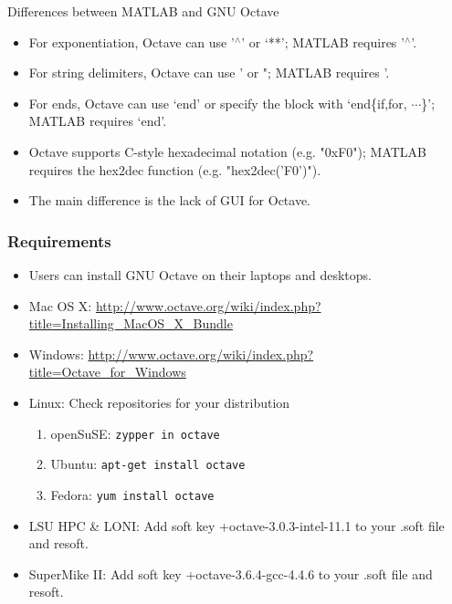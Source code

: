 \documentclass[t,compress,xcolor=svgnames]{beamer}
\begin{document}
\begin{frame}[allowframebreaks]{\small Differences between MATLAB and GNU Octave}
\begin{itemize}
    \item For exponentiation, Octave can use '$^\wedge$' or `**'; MATLAB requires '$^\wedge$'.
    \item For string delimiters, Octave can use ' or "; MATLAB requires '.
    \item For ends, Octave can use `end' or specify the block with `end\{if,for, $\cdots$\}'; MATLAB requires `end'.
    \item Octave supports C-style hexadecimal notation (e.g. "0xF0"); MATLAB requires the hex2dec function (e.g. "hex2dec('F0')").
    \item The main difference is the lack of GUI for Octave.
  \end{itemize}
\end{frame}

\begin{frame}
  \frametitle{\small Requirements}
  \begin{itemize}
    \item Users can install GNU Octave on their laptops and desktops.
    \item{Mac OS X:} \url{http://www.octave.org/wiki/index.php?title=Installing_MacOS_X_Bundle}
    \item{Windows:} \url{http://www.octave.org/wiki/index.php?title=Octave_for_Windows} 
    \item{Linux:} Check repositories for your distribution
    \begin{enumerate}
      \item{openSuSE:} \texttt{zypper in octave}
      \item{Ubuntu:} \texttt{apt-get install octave}
      \item{Fedora:} \texttt{yum install octave}
    \end{enumerate}
    \item LSU HPC \& LONI: Add soft key +octave-3.0.3-intel-11.1 to your .soft file and resoft.
    \item SuperMike II: Add soft key +octave-3.6.4-gcc-4.4.6 to your .soft file and resoft.
  \end{itemize}
\end{frame}
\end{document}
